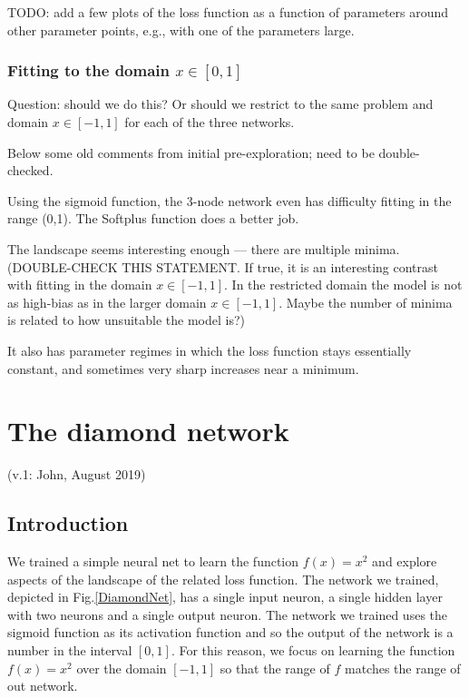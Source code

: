 \documentclass[12pt,a4paper]{article}
\begin{document}
TODO: add a few plots of the loss function as a function of parameters around other parameter
points, e.g., with one of the parameters large.  



\newpage

\subsubsection{Fitting to the domain $x\in[0,1]$}

Question: should we do this?  Or should we restrict to the same problem and domain  $x\in[-1,1]$ for
each of the three networks.  

Below some old comments from initial pre-exploration; need to be double-checked.

Using the sigmoid function, the 3-node network even has difficulty fitting in the range (0,1).  The Softplus
function does a better job.

The landscape seems interesting enough --- there are multiple minima. (DOUBLE-CHECK THIS STATEMENT.
If true, it is an interesting contrast with fitting in the domain  $x\in[-1,1]$.  In the
restricted domain the model is not as high-bias as in the larger domain  $x\in[-1,1]$.  Maybe the
number of minima is related to how unsuitable the model is?)


It also has parameter regimes in which the loss function stays essentially constant, and sometimes
very sharp increases near a minimum.








\newpage

\section{The diamond network}

(v.1: John, August 2019)

\subsection{Introduction}

We trained a simple neural net to learn the function $f(x)=x^2$ and explore aspects of the landscape of the related loss function. The network we trained, depicted in Fig.\ref{DiamondNet}, has a single input neuron, a single hidden layer with two neurons and a single output neuron. The network we trained uses the sigmoid function as its activation function and so the output of the network is a number in the interval $[0,1]$. For this reason, we focus on learning the function $f(x)=x^2$ over the domain $[-1,1]$ so that the range of $f$ matches the range of out network.
\end{document}
